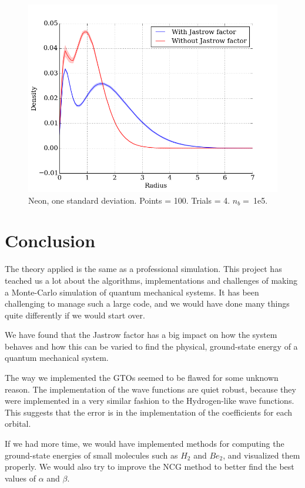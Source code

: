 \documentclass[twocolumns, a4paper,11pt,fleqn]{extarticle}
\begin{document}
\begin{figure}[H]
	\includegraphics[width=\columnwidth]{../res/plot/neon_03/neon_03_pretty.png}
	\caption{Neon, one standard deviation. 
	Points = 100. Trials = 4.	$n_b = \:$1e5.}
	\label{fig:neon_03}
\end{figure}

\vspace{5em}

\section{Conclusion}
The theory applied is the same as a professional
simulation.
This project has teached us a lot about the algorithms, implementations and challenges
of making a Monte-Carlo simulation of quantum mechanical systems. 
It has been challenging to manage such a large code,
and we would have done many things quite differently if we
would start over.

We have found that the Jastrow factor has a big impact on how the system behaves and how
this can be varied to find the physical, ground-state energy of a quantum mechanical system. 

The way we implemented the GTOs seemed to be flawed for some unknown reason.
The implementation of the wave functions are quiet robust,
because they were implemented in a very similar fashion to the Hydrogen-like
wave functions. This suggests that the error is in the implementation
of the coefficients for each orbital.

If we had more time, we would have implemented methods for computing the
ground-state energies of small molecules such as $H_2$ and $Be_2$, and
visualized them properly. We would also try to improve the NCG method
to better find the best values of $\alpha$ and $\beta$.
\end{document}
